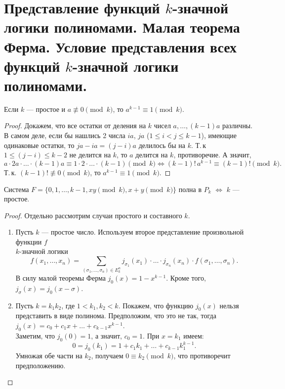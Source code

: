 \section{Представление функций $k$-значной логики полиномами. Малая теорема Ферма. Условие представления всех функций $k$-значной логики полиномами.}

\begin{theorem}
    Если $k$ --- простое и $a \not\equiv 0 \pmod k$, то $a^{k-1} \equiv 1 \pmod k$.
\end{theorem}

\begin{proof}
    Докажем, что все остатки от деления на $k$ чисел $a, \ldots, (k-1)a$ различны.\\
    В самом деле, если бы нашлись 2 числа $ia$, $ja$ ($1\leqslant i < j \leqslant k-1$), имеющие одинаковые остатки, то $ja-ia = (j-i)a$ делилось бы на $k$. Т.\,к $1\leqslant(j-i) \leqslant k-2$ не делится на $k$, то $a$ делится на $k$, противоречие. А значит,
    \[
        a \cdot 2a \cdot \ldots \cdot (k-1)a \equiv 1\cdot 2 \cdot \ldots \cdot (k-1) \pmod k \Leftrightarrow (k-1)!\,a^{k-1} \equiv (k-1)! \pmod k.
    \]
    Т.\,к. $(k-1)! \not \equiv 0 \pmod k$, то $a^{k-1} \equiv 1 \pmod k$.
\end{proof}

\begin{theorem}
    Система $F = \{0, 1, \ldots, k - 1, xy \pmod k, x + y \pmod k\}$ полна в $P_k$ $\Leftrightarrow$ $k$ --- простое. 
\end{theorem}

\begin{proof}
    Отдельно рассмотрим случаи простого и составного $k$.
    \begin{enumerate}
        \item Пусть $k$ --- простое число. Используем второе представление произвольной функции $f$\\
        $k$-значной логики
        \[
            f(x_1, \ldots, x_n) = \sum_{(\sigma_1, \ldots, \sigma_n) \in E^n_k} j_{\sigma_1}(x_1)\cdot \ldots \cdot j_{\sigma_n}(x_n) \cdot f(\sigma_1, \ldots, \sigma_n).
        \]
        В силу малой теоремы Ферма $j_0(x) = 1 - x^{k-1}$. Кроме того, $j_\sigma(x) = j_0 (x-\sigma)$.
        \item Пусть $k = k_1k_2$, где $1 < k_1, k_2 < k$. Покажем, что функцию $j_0(x)$ нельзя представить в виде полинома. Предположим, что это не так, тогда $j_0(x) = c_0 + c_1x + \ldots + c_{k-1} x^{k-1}$.\\
        Заметим, что $j_0(0) = 1$, а значит, $c_0 = 1$. При $x=k_1$ имеем:
        \[
            0 = j_0(k_1) = 1 + c_1k_1 + \ldots + c_{k-1}k_1^{k-1}. 
        \]
        Умножая обе части на $k_2$, получаем $0 \equiv k_2 \pmod k$, что противоречит предположению.
    \end{enumerate}
\end{proof}